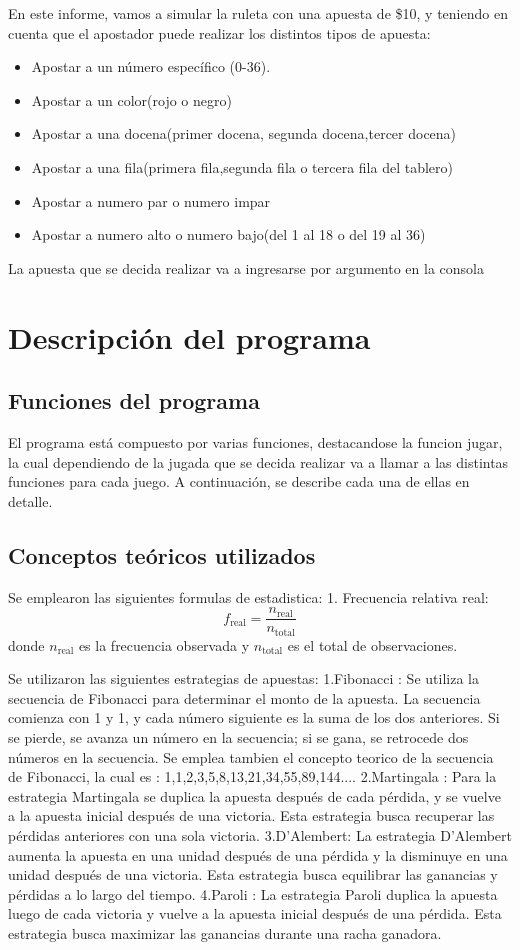 \documentclass{article}
\begin{document}
En este informe, vamos a simular la ruleta con una apuesta de \$10, y teniendo en cuenta que el apostador puede realizar los distintos tipos de apuesta:
\begin{itemize}
    \item Apostar a un número específico (0-36).
    \item Apostar a un color(rojo o negro)
    \item Apostar a una docena(primer docena, segunda docena,tercer docena)
    \item Apostar a una fila(primera fila,segunda fila o tercera fila del tablero)
    \item Apostar a numero par o numero impar
    \item Apostar a numero alto o numero bajo(del 1 al 18 o del 19 al 36)
\end{itemize}
La apuesta que se decida realizar va a ingresarse por argumento en la consola
    
\section{Descripción del programa}
\subsection{Funciones del programa}
El programa está compuesto por varias funciones, destacandose la funcion jugar, la cual dependiendo de la jugada que se decida realizar va a llamar a las distintas funciones para cada juego. A continuación, se describe cada una de ellas en detalle.

\subsection{Conceptos teóricos utilizados}
Se emplearon las siguientes formulas de estadistica:
1. Frecuencia relativa real:
\[
f_{\text{real}} = \frac{n_{\text{real}}}{n_{\text{total}}}
\]
donde \( n_{\text{real}} \) es la frecuencia observada y \( n_{\text{total}} \) es el total de observaciones.

Se utilizaron las siguientes estrategias de apuestas:
1.Fibonacci : 
Se utiliza la secuencia de Fibonacci para determinar el monto de la apuesta. La secuencia comienza con 1 y 1, y cada número siguiente es la suma de los dos anteriores. Si se pierde, se avanza un número en la secuencia; si se gana, se retrocede dos números en la secuencia.
Se emplea tambien el concepto teorico de la secuencia de Fibonacci, la cual es : 1,1,2,3,5,8,13,21,34,55,89,144....
2.Martingala :
Para la estrategia Martingala se duplica la apuesta después de cada pérdida, y se vuelve a la apuesta inicial después de una victoria. Esta estrategia busca recuperar las pérdidas anteriores con una sola victoria.
3.D’Alembert:
La estrategia D'Alembert aumenta la apuesta en una unidad después de una pérdida y la disminuye en una unidad después de una victoria. Esta estrategia busca equilibrar las ganancias y pérdidas a lo largo del tiempo.
4.Paroli : 
La estrategia Paroli duplica la apuesta luego de cada victoria y vuelve a la apuesta inicial después de una pérdida. Esta estrategia busca maximizar las ganancias durante una racha ganadora.
\end{document}
